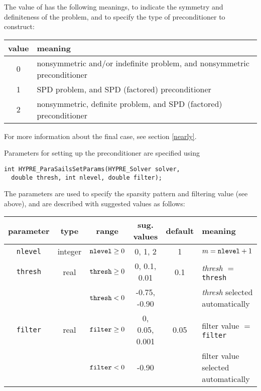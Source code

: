 The value of  has the following meanings, to indicate
the symmetry and definiteness of the problem, and to specify the 
type of preconditioner to construct:
\begin{center}
\begin{tabular}{|c|l|} \hline
value & meaning \\ \hline
0 & nonsymmetric and/or indefinite problem, and nonsymmetric preconditioner \\
1 & SPD problem, and SPD (factored) preconditioner \\
2 & nonsymmetric, definite problem, and SPD (factored) preconditioner \\ 
\hline
\end{tabular}
\end{center}
For more information about the final case, see section \ref{nearly}.

Parameters for setting up the preconditioner are specified using
\begin{display}
\begin{verbatim}
int HYPRE_ParaSailsSetParams(HYPRE_Solver solver, 
  double thresh, int nlevel, double filter);
\end{verbatim}
\end{display}

The parameters are used to specify the sparsity pattern and filtering value
(see above), and are described with suggested values as follows:

\begin{center}
\begin{tabular}{|c|c|c|c|c|l|} \hline
parameter    & type    & range                & sug. values  & default & meaning \\ \hline
{\tt nlevel} & integer & ${\tt nlevel} \ge 0$ & 0, 1, 2      & 1   & $m={\tt nlevel}+1$\\
\hline
{\tt thresh} & real    & ${\tt thresh} \ge 0$ & 0, 0.1, 0.01 & 0.1 & {\em thresh} $=$ {\tt thresh}\\
             &         & ${\tt thresh}  <  0$ & -0.75, -0.90 &     & {\em thresh} selected automatically\\
\hline
{\tt filter} & real    & ${\tt filter} \ge 0$ & 0, 0.05, 0.001 & 0.05 & filter value $=$ {\tt filter}\\
             &         & ${\tt filter}  <  0$ & -0.90        &     & filter value selected automatically\\
\hline
\end{tabular}
\end{center}

